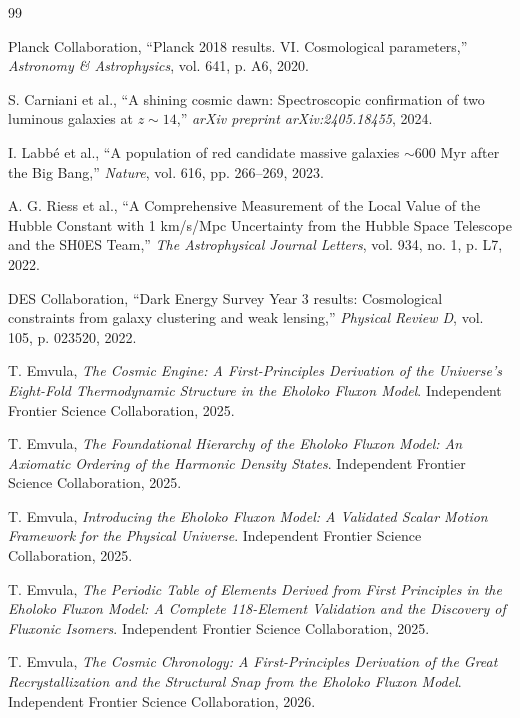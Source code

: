 \documentclass[11pt, twoside]{article}
\begin{document}

\begin{thebibliography}{99}
\raggedright

Planck Collaboration, ``Planck 2018 results. VI. Cosmological parameters,'' \textit{Astronomy \& Astrophysics}, vol. 641, p. A6, 2020.

S. Carniani et al., ``A shining cosmic dawn: Spectroscopic confirmation of two luminous galaxies at $z \sim 14$,'' \textit{arXiv preprint arXiv:2405.18455}, 2024.

I. Labb\'e et al., ``A population of red candidate massive galaxies $\sim 600$ Myr after the Big Bang,'' \textit{Nature}, vol. 616, pp. 266--269, 2023.

A. G. Riess et al., ``A Comprehensive Measurement of the Local Value of the Hubble Constant with 1 km/s/Mpc Uncertainty from the Hubble Space Telescope and the SH0ES Team,'' \textit{The Astrophysical Journal Letters}, vol. 934, no. 1, p. L7, 2022.

DES Collaboration, ``Dark Energy Survey Year 3 results: Cosmological constraints from galaxy clustering and weak lensing,'' \textit{Physical Review D}, vol. 105, p. 023520, 2022.

T. Emvula, \textit{The Cosmic Engine: A First-Principles Derivation of the Universe's Eight-Fold Thermodynamic Structure in the Eholoko Fluxon Model}. Independent Frontier Science Collaboration, 2025.

T. Emvula, \textit{The Foundational Hierarchy of the Eholoko Fluxon Model: An Axiomatic Ordering of the Harmonic Density States}. Independent Frontier Science Collaboration, 2025.

T. Emvula, \textit{Introducing the Eholoko Fluxon Model: A Validated Scalar Motion Framework for the Physical Universe}. Independent Frontier Science Collaboration, 2025.

T. Emvula, \textit{The Periodic Table of Elements Derived from First Principles in the Eholoko Fluxon Model: A Complete 118-Element Validation and the Discovery of Fluxonic Isomers}. Independent Frontier Science Collaboration, 2025.

T. Emvula, \textit{The Cosmic Chronology: A First-Principles Derivation of the Great Recrystallization and the Structural Snap from the Eholoko Fluxon Model}. Independent Frontier Science Collaboration, 2026.


\end{thebibliography}
\end{document}
